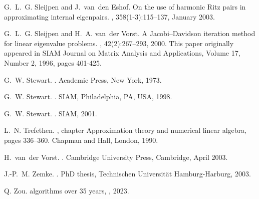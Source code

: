 \documentclass{report}
\begin{document}
\begin{thebibliography}{100}
		
	 G.~L.~G. Sleijpen and J.~van~den Eshof. \newblock On the use of harmonic {Ritz}
	pairs in approximating internal
	eigenpairs.
	, 358(1-3):115--137, January
	2003.
	
	 G.~L.~G. Sleijpen and H.~A. van~der Vorst. \newblock A {Jacobi--Davidson}
	iteration method for linear eigenvalue problems. , 42(2):267--293, 2000. \newblock
	This paper originally appeared in SIAM Journal on Matrix Analysis and
	Applications, Volume 17, Number 2, 1996, pages 401-425.
	

	 G.~W. Stewart. . \newblock
    Academic Press, New York, 1973.

     G.~W. Stewart. .
    \newblock SIAM, Philadelphia, PA, USA, 1998.


	
	 G.~W. Stewart. . \newblock
	SIAM, 2001.
	
	
	 L.~N. Trefethen. , chapter
    Approximation theory
  and numerical linear algebra, pages 336--360.
\newblock Chapman and Hall, London, 1990.


	
	
 H.~van~der Vorst. .
\newblock Cambridge University Press, Cambridge, April 2003.
	
	
 J.-P.~M. Zemke. .
\newblock PhD thesis, Technischen Universität Hamburg-Harburg, 2003.
	
	
  Q. Zou.
 algorithms over 35 years,
   ,
 2023.
			

	
	
	\markboth{}{}
	
\end{thebibliography}
\end{document}
